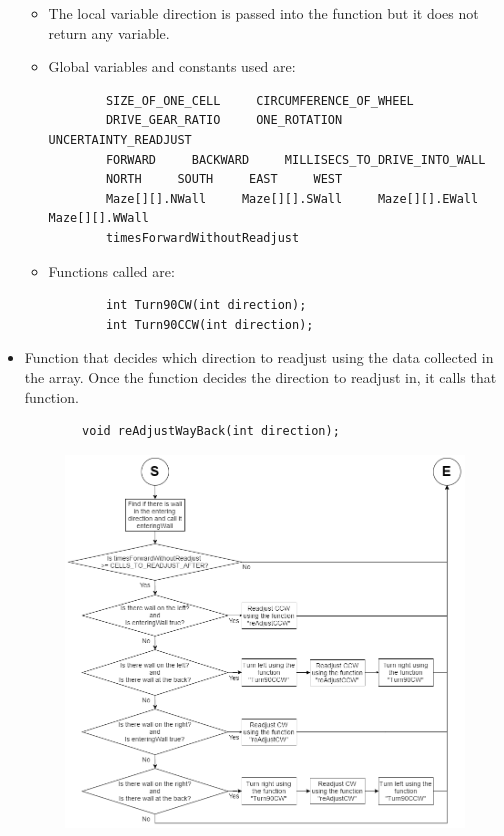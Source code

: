 \documentclass[11pt]{article}
\begin{document}
\begin{itemize}
\begin{figure}[htp]
\label{}
\end{figure}
	\begin{itemize}
	\item The local variable direction is passed into the function but it does not return any variable.
	\item Global variables and constants used are:
	\begin{verbatim}
		SIZE_OF_ONE_CELL     CIRCUMFERENCE_OF_WHEEL
		DRIVE_GEAR_RATIO     ONE_ROTATION     UNCERTAINTY_READJUST
		FORWARD     BACKWARD     MILLISECS_TO_DRIVE_INTO_WALL
		NORTH     SOUTH     EAST     WEST
		Maze[][].NWall     Maze[][].SWall     Maze[][].EWall     Maze[][].WWall
		timesForwardWithoutReadjust
	\end{verbatim}
	\item Functions called are:
	\begin{verbatim}
		int Turn90CW(int direction);
		int Turn90CCW(int direction);
	\end{verbatim}
	\end{itemize}
\item Function that decides which direction to readjust using the data collected in the array. Once the function decides the direction to readjust in, it calls that function.
	\begin{verbatim}
		void reAdjustWayBack(int direction);
	\end{verbatim}
\begin{figure}[htp]
\centering
\includegraphics[scale=0.47]{images/Software_Flowchart/reAdjustWayBack.png}

\end{figure}
\end{itemize}
\end{document}
